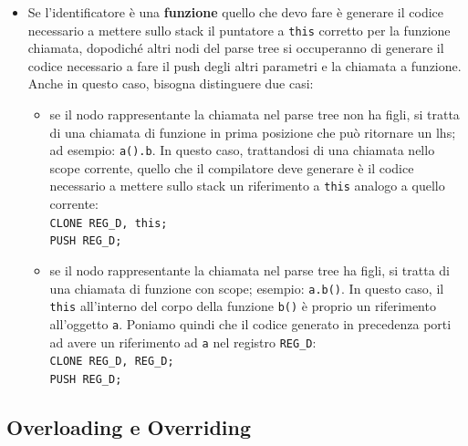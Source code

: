 \documentclass[a4paper, 11pt]{article}
\newcommand{\code}[1]{\scriptsize{\texttt{#1}}\normalsize}
\begin{document}
\begin{itemize}
\begin{itemize}
\item se tale variabile si trova in posizione \textbf{intermedia} o \textbf{finale} (cio\`e se ha figli nel parse tree), \`e sicuramente membro di un oggetto: nel registro \code{REG\_D} ricevo gi\`a l'indirizzo base dell'oggetto e ottengo l'indirizzo dell'area dati e quindi del membro specifico con la coppia di istruzioni\\
\code{LEA REG\_D, REG\_D;\\
PADD REG\_D, REG\_D, identOffset;}

\end{itemize}
\item Se l'identificatore \`e una \textbf{funzione} quello che devo fare \`e generare il codice necessario a mettere sullo stack il puntatore a \code{this} corretto per la funzione chiamata, dopodich\'e altri nodi del parse tree si occuperanno di generare il codice necessario a fare il push degli altri parametri e la chiamata a funzione. Anche in questo caso, bisogna distinguere due casi:
\begin{itemize}
\item  se il nodo rappresentante la chiamata nel parse tree non ha figli, si tratta di una chiamata di funzione in prima posizione che pu\`o ritornare un lhs; ad esempio: \code{a().b}.
In questo caso, trattandosi di una chiamata nello scope corrente, quello che il compilatore deve generare \`e il codice necessario a mettere sullo stack un riferimento a \code{this} analogo a quello corrente:\\
\code{CLONE REG\_D, this;\\
PUSH REG\_D;}
\item se il nodo rappresentante la chiamata nel parse tree ha figli, si tratta di una chiamata di funzione con scope; esempio: \code{a.b()}.
In questo caso, il \code{this} all'interno del corpo della funzione \code{b()} \`e proprio un riferimento all'oggetto \code{a}. Poniamo quindi che il codice generato in precedenza porti ad avere un riferimento ad \code{a} nel registro \code{REG\_D}:\\
\code{CLONE REG\_D, REG\_D;\\
PUSH REG\_D;}
\end{itemize}
\end{itemize}




\subsection{Overloading e Overriding}
\end{document}
